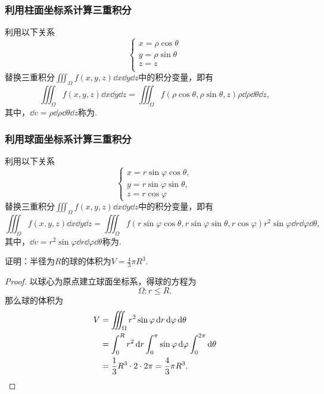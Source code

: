 \subsubsection{利用柱面坐标系计算三重积分}
利用以下关系\[
\left\{ \begin{array}{l}
x = \rho\cos\theta \\
y = \rho\sin\theta \\
z = z \\
\end{array} \right.
\]替换三重积分\(\iiint_{\Omega}{f(x,y,z)\dd{x}\dd{y}\dd{z}}\)中的积分变量，即有\[
\iiint_{\Omega}{f(x,y,z)\dd{x}\dd{y}\dd{z}}
= \iiint_{\Omega}{f(\rho \cos\theta,\rho \sin\theta,z) \rho \dd{\rho} \dd{\theta} \dd{z}},
\]其中，\(\dd{v} = \rho \dd{\rho} \dd{\theta} \dd{z}\)称为.

\subsubsection{利用球面坐标系计算三重积分}
利用以下关系\[
\left\{ \begin{array}{l}
x = r \sin\varphi \cos\theta, \\
y = r \sin\varphi \sin\theta, \\
z = r \cos\varphi
\end{array} \right.
\]替换三重积分\(\iiint_{\Omega}{f(x,y,z)\dd{x}\dd{y}\dd{z}}\)中的积分变量，即有\[
\iiint_{\Omega}{f(x,y,z)\dd{x}\dd{y}\dd{z}}
= \iiint_{\Omega}{f(r \sin\varphi \cos\theta,r \sin\varphi \sin\theta,r \cos\varphi) r^2 \sin\varphi \dd{r} \dd{\varphi} \dd{\theta}},
\]其中，\(\dd{v} = r^2 \sin\varphi \dd{r} \dd{\varphi} \dd{\theta}\)称为.

\begin{example}
证明：半径为\(R\)的球的体积为\(V = \frac{4}{3} \pi R^3\).
\begin{proof}
以球心为原点建立球面坐标系，得球的方程为\[
\Omega: r \leq R.
\]那么球的体积为\begin{align*}
V &= \iiint_{\Omega} r^2 \sin\varphi \dd{r} \dd{\varphi} \dd{\theta} \\
&= \int_0^R r^2 \dd{r} \int_0^{\pi} \sin\varphi \dd{\varphi} \int_0^{2\pi} \dd{\theta} \\
&= \frac{1}{3} R^3 \cdot 2 \cdot 2\pi
= \frac{4}{3} \pi R^3.
\qedhere
\end{align*}
\end{proof}
\end{example}

